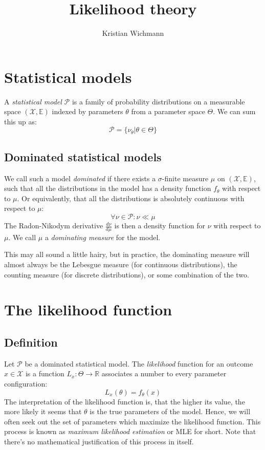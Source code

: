 \documentclass[12pt, a4paper]{article}
\title{Likelihood theory}
\author{Kristian Wichmann}
\numberwithin{equation}{section}
\begin{document}
\maketitle

\section{Statistical models}
A \textit{statistical model} $\mathcal{P}$ is a family of probability distributions on a measurable space $(\mathcal{X},\mathbb{E})$ indexed by parameters $\theta$ from a parameter space $\Theta$. We can sum this up as:
\begin{equation}
\mathcal{P}=\{\nu_\theta|\theta\in\Theta\}
\end{equation}

\subsection{Dominated statistical models}
We call such a model \textit{dominated} if there exists a $\sigma$-finite measure $\mu$ on $(\mathcal{X},\mathbb{E})$, such that all the distributions in the model has a density function $f_\theta$ with respect to $\mu$. Or equivalently, that all the distributions is absolutely continuous with respect to $\mu$:
\begin{equation}
\forall\nu\in\mathcal{P}: \nu\ll\mu
\end{equation}
The Radon-Nikodym derivative $\frac{d\nu}{d\mu}$ is then a density function for $\nu$ with respect to $\mu$. We call $\mu$ a \textit{dominating measure} for the model.

This may all sound a little hairy, but in practice, the dominating measure will almost always be the Lebesgue measure (for continuous distributions), the counting measure (for discrete distributions), or some combination of the two.

\section{The likelihood function}

\subsection{Definition}
Let $\mathcal{P}$ be a dominated statistical model. The \textit{likelihood} function for an outcome $x\in\mathcal{X}$ is a function $L_x:\Theta\rightarrow\mathbb{R}$ associates a number to every parameter configuration:
\begin{equation}
L_x(\theta)=f_\theta(x)
\end{equation}
The interpretation of the likelihood function is, that the higher its value, the more likely it seems that $\theta$ is the true parameters of the model. Hence, we will often seek out the set of parameters which maximize the likelihood function. This process is known as \textit{maximum likelihood estimation} or MLE for short. Note that there's no mathematical justification of this process in itself.
\end{document}
